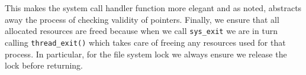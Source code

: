 \documentclass{article}
\renewcommand{\_}{\char`_}
\begin{document}
This makes the system call handler function more elegant and as noted, abstracts away the process of checking validity of pointers. Finally, we ensure that all allocated resources are freed because when we call \lstinline{sys_exit} we are in turn calling \lstinline{thread_exit()} which takes care of freeing any resources used for that process. In particular, for the file system lock we always ensure we release the lock before returning.

\end{document}
